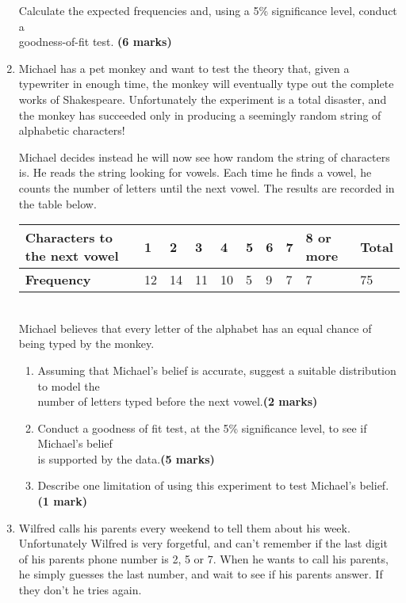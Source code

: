 \documentclass[fleqn]{article}
\begin{document}
\begin{enumerate}
        Calculate the expected frequencies and, using a 5\% significance level, conduct a \\goodness-of-fit test. \hfill\textbf{(6 marks)}
    \newpage
    \item Michael has a pet monkey and want to test the theory that, given a typewriter in enough time, the monkey will eventually type out the complete works of Shakespeare. Unfortunately the experiment is a total disaster, and the monkey has succeeded only in producing a seemingly random string of alphabetic characters!
        
        Michael decides instead he will now see how random the string of characters is. He reads the string looking for vowels. Each time he finds a vowel, he counts the number of letters until the next vowel. The results are recorded in the table below.\vspace{3mm}\\
        \begin{tabularx}{0.9\textwidth}{|X|*7{P{7mm}|}P{16mm}|P{12mm}|}
            \hline
            \textbf{Characters to the next vowel} & 1 & 2 & 3 & 4 & 5 & 6 & 7 & 8 or more & \textbf{Total}  \\\hline
            \textbf{Frequency} & 12  & 14  & 11  & 10  & 5   & 9 & 7 & 7 & 75    \\\hline
        \end{tabularx}\vspace{3mm}\\

        Michael believes that every letter of the alphabet has an equal chance of being typed by the monkey.
        \begin{enumerate}[label=\bfseries \alph*\space ]
            \item Assuming that Michael's belief is accurate, suggest a suitable distribution to model the \\number of letters typed before the next vowel.\hfill\textbf{(2 marks)}
            \item Conduct a goodness of fit test, at the 5\% significance level, to see if Michael's belief\\ is supported by the data.\hfill\textbf{(5 marks)}
            \item Describe one limitation of using this experiment to test Michael's belief. \hfill\textbf{(1 mark)}
        \end{enumerate}
    \item Wilfred calls his parents every weekend to tell them about his week. Unfortunately Wilfred is very forgetful, and can't remember if the last digit of his parents phone number is 2, 5 or 7. When he wants to call his parents, he simply guesses the last number, and wait to see if his parents answer. If they don't he tries again.
    

\end{enumerate}
\end{document}
